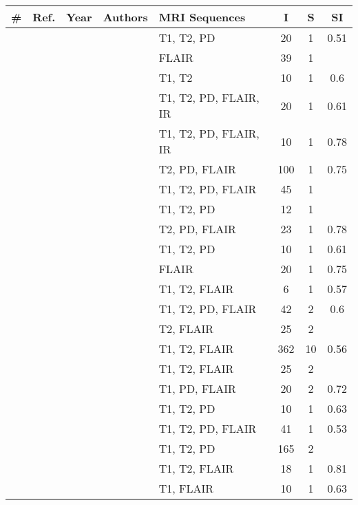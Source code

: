 \newcommand{\citefortable}[1]{%
  \stepcounter{papercount}{\thepapercount}&{\cite{#1}}&{\citeyear{#1}}&{\citeauthor{#1}}}
\begin{tabular}{cccllccc}
  \hline
  \# & Ref. & Year & Authors & MRI Sequences & I & S & SI \\
  \hline
  \citefortable{VanLeemput2001} & T1, T2, PD & 20 & 1 & 0.51 \\
    \citefortable{Jack2001} & FLAIR & 39 & 1 &  \\
    \citefortable{Zijdenbos2002} & T1, T2 & 10 & 1 & 0.6 \\
    \citefortable{Anbeek2004} & T1, T2, PD, FLAIR, IR & 20 & 1 & 0.61 \\
    \citefortable{Anbeek2005} & T1, T2, PD, FLAIR, IR & 10 & 1 & 0.78 \\
    \citefortable{Admiraal-Behloul2005} & T2, PD, FLAIR & 100 & 1 & 0.75 \\
    \citefortable{Lao2006} & T1, T2, PD, FLAIR & 45 & 1 &  \\
    \citefortable{Wu2006} & T1, T2, PD & 12 & 1 &  \\
    \citefortable{Sajja2006} & T2, PD, FLAIR & 23 & 1 & 0.78 \\
    \citefortable{Harmouche2006} & T1, T2, PD & 10 & 1 & 0.61 \\
    \citefortable{Khayati2008} & FLAIR & 20 & 1 & 0.75 \\
    \citefortable{Wels2008} & T1, T2, FLAIR & 6 & 1 & 0.57 \\
    \citefortable{Herskovits2008} & T1, T2, PD, FLAIR & 42 & 2 & 0.6 \\
    \citefortable{Bricq2008} & T2, FLAIR & 25 & 2 &  \\
    \citefortable{Dyrby2008} & T1, T2, FLAIR & 362 & 10 & 0.56 \\
    \citefortable{Souplet2008} & T1, T2, FLAIR & 25 & 2 &  \\
    \citefortable{DeBoer2009b} & T1, PD, FLAIR & 20 & 2 & 0.72 \\
    \citefortable{Garcia-Lorenzo2009} & T1, T2, PD & 10 & 1 & 0.63 \\
    \citefortable{Akselrod-Ballin2009} & T1, T2, PD, FLAIR & 41 & 1 & 0.53 \\
    \citefortable{Schwarz2009} & T1, T2, PD & 165 & 2 &  \\
    \citefortable{Gibson2010} & T1, T2, FLAIR & 18 & 1 & 0.81 \\
    \citefortable{Shiee2010} & T1, FLAIR & 10 & 1 & 0.63 \\

\end{tabular}
